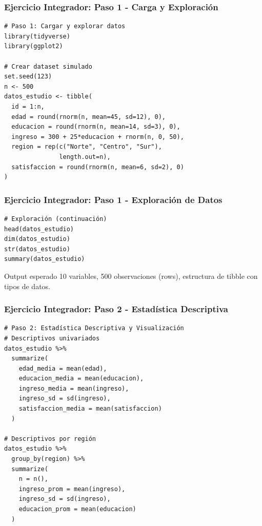 \documentclass[aspectratio=169,11pt]{beamer}
\begin{document}
\begin{frame}[fragile]
\frametitle{Ejercicio Integrador: Paso 1 - Carga y Exploración}
\begin{lstlisting}
# Paso 1: Cargar y explorar datos
library(tidyverse)
library(ggplot2)

# Crear dataset simulado
set.seed(123)
n <- 500
datos_estudio <- tibble(
  id = 1:n,
  edad = round(rnorm(n, mean=45, sd=12), 0),
  educacion = round(rnorm(n, mean=14, sd=3), 0),
  ingreso = 300 + 25*educacion + rnorm(n, 0, 50),
  region = rep(c("Norte", "Centro", "Sur"),
               length.out=n),
  satisfaccion = round(rnorm(n, mean=6, sd=2), 0)
)
\end{lstlisting}
\end{frame}

\begin{frame}[fragile]
\frametitle{Ejercicio Integrador: Paso 1 - Exploración de Datos}
\begin{lstlisting}
# Exploración (continuación)
head(datos_estudio)
dim(datos_estudio)
str(datos_estudio)
summary(datos_estudio)
\end{lstlisting}
\vspace{0.3cm}
\begin{exampleblock}{Output esperado}
  10 variables, 500 observaciones (rows), estructura de tibble con tipos de datos.
\end{exampleblock}
\end{frame}

\begin{frame}[fragile]
\frametitle{Ejercicio Integrador: Paso 2 - Estadística Descriptiva}
\begin{lstlisting}
# Paso 2: Estadística Descriptiva y Visualización
# Descriptivos univariados
datos_estudio %>%
  summarize(
    edad_media = mean(edad),
    educacion_media = mean(educacion),
    ingreso_media = mean(ingreso),
    ingreso_sd = sd(ingreso),
    satisfaccion_media = mean(satisfaccion)
  )

# Descriptivos por región
datos_estudio %>%
  group_by(region) %>%
  summarize(
    n = n(),
    ingreso_prom = mean(ingreso),
    ingreso_sd = sd(ingreso),
    educacion_prom = mean(educacion)
  )
\end{lstlisting}
\end{frame}
\end{document}
